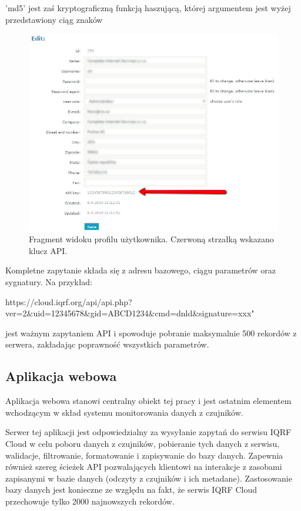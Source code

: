 \documentclass[a4paper, 12pt]{article}
\begin{document}
'md5' jest zaś kryptograficzną funkcją haszującą, której argumentem jest wyżej przedstawiony ciąg znaków 


\begin{figure}[H]
    \includegraphics[width=\textwidth]{zdj/api-key.png}
    \caption{Fragment widoku profilu użytkownika. Czerwoną strzałką wskazano klucz API.}
\end{figure}

Kompletne zapytanie składa się z adresu bazowego, ciągu parametrów oraz sygnatury. Na przykład:
\begin{center}
    \begin{small}
        https://cloud.iqrf.org/api/api.php?ver=2\&uid=12345678\&gid=ABCD1234\&cmd=dnld\&signature=xxx"
    \end{small}
\end{center}

jest ważnym zapytaniem API i spowoduje pobranie maksymalnie 500 rekordów z serwera, zakładając poprawność wszystkich parametrów.

\subsection{Aplikacja webowa}

Aplikacja webowa stanowi centralny obiekt tej pracy i jest ostatnim elementem wchodzącym w skład systemu monitorowania danych
z czujników. 

Serwer tej aplikacji jest odpowiedzialny za wysyłanie zapytań do serwisu IQRF Cloud w celu poboru danych z czujników, pobieranie
tych danych z serwisu, walidacje, filtrowanie, formatowanie i zapisywanie do bazy danych. Zapewnia również szereg ścieżek API pozwalających
klientowi na interakcje z zasobami zapisanymi w bazie danych (odczyty z czujników i ich metadane). Zastosowanie bazy danych 
jest konieczne ze względu na fakt, że serwis IQRF Cloud przechowuje tylko 2000 najnowszych rekordów.
\end{document}

